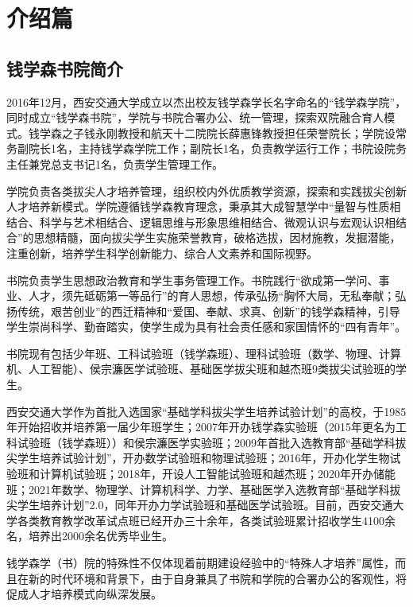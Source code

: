 \documentclass[
decoration,  %
]{qyxf-book}
\begin{document}
	
	\newpage
	\thispagestyle{empty}
	\mbox{}
	\newpage
	\tableofcontents
	
	\pagestyle{headings}
	
	\chapter{介绍篇}
	\section{钱学森书院简介}
	2016年12月，西安交通大学成立以杰出校友钱学森学长名字命名的“钱学森学院”，同时成立“钱学森书院”，学院与书院合署办公、统一管理，探索双院融合育人模式。钱学森之子钱永刚教授和航天十二院院长薛惠锋教授担任荣誉院长；学院设常务副院长1名，主持钱学森学院工作；副院长1名，负责教学运行工作；书院设院务主任兼党总支书记1名，负责学生管理工作。
	
	学院负责各类拔尖人才培养管理，组织校内外优质教学资源，探索和实践拔尖创新人才培养新模式。学院遵循钱学森教育理念，秉承其大成智慧学中“量智与性质相结合、科学与艺术相结合、逻辑思维与形象思维相结合、微观认识与宏观认识相结合”的思想精髓，面向拔尖学生实施荣誉教育，破格选拔，因材施教，发掘潜能，注重创新，培养学生科学创新能力、综合人文素养和国际视野。
	
	书院负责学生思想政治教育和学生事务管理工作。书院践行“欲成第一学问、事业、人才，须先砥砺第一等品行”的育人思想，传承弘扬“胸怀大局，无私奉献；弘扬传统，艰苦创业”的西迁精神和“爱国、奉献、求真、创新”的钱学森精神，引导学生崇尚科学、勤奋踏实，使学生成为具有社会责任感和家国情怀的“四有青年”。
	
	书院现有包括少年班、工科试验班（钱学森班）、理科试验班（数学、物理、计算机、人工智能）、侯宗濂医学试验班、基础医学拔尖班和越杰班9类拔尖试验班的学生。
	
	西安交通大学作为首批入选国家“基础学科拔尖学生培养试验计划”的高校，于1985年开始招收并培养第一届少年班学生；2007年开办钱学森实验班（2015年更名为工科试验班（钱学森班））和侯宗濂医学实验班；2009年首批入选教育部“基础学科拔尖学生培养试验计划”，开办数学试验班和物理试验班；2016年，开办化学生物试验班和计算机试验班；2018年，开设人工智能试验班和越杰班；2020年开办储能班；2021年数学、物理学、计算机科学、力学、基础医学入选教育部“基础学科拔尖学生培养计划”2.0，同年开办力学试验班和基础医学试验班。目前，西安交通大学各类教育教学改革试点班已经开办三十余年，各类试验班累计招收学生4100余名，培养出2000余名优秀毕业生。
	
	钱学森学（书）院的特殊性不仅体现着前期建设经验中的“特殊人才培养”属性，而且在新的时代环境和背景下，由于自身兼具了书院和学院的合署办公的客观性，将促成人才培养模式向纵深发展。
	
\end{document}
